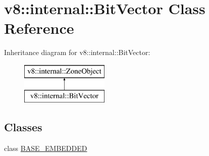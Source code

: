 \hypertarget{classv8_1_1internal_1_1_bit_vector}{}\section{v8\+:\+:internal\+:\+:Bit\+Vector Class Reference}
\label{classv8_1_1internal_1_1_bit_vector}
Inheritance diagram for v8\+:\+:internal\+:\+:Bit\+Vector\+:\begin{figure}[H]
\begin{center}
\leavevmode
\includegraphics[height=2.000000cm]{classv8_1_1internal_1_1_bit_vector}
\end{center}
\end{figure}
\subsection*{Classes}
\begin{DoxyCompactItemize}
\item 
class \hyperlink{classv8_1_1internal_1_1_bit_vector_1_1_b_a_s_e___e_m_b_e_d_d_e_d}{B\+A\+S\+E\+\_\+\+E\+M\+B\+E\+D\+D\+ED}
\end{DoxyCompactItemize}

